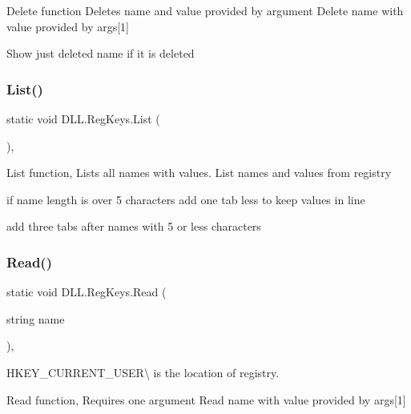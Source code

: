 Delete function Deletes name and value provided by argument Delete name with value provided by args\mbox{[}1\mbox{]}

Show just deleted name if it is deleted \hypertarget{class_d_l_l_1_1_reg_keys_a35d1d2983964074d9d2921927929b6f8}{}\label{class_d_l_l_1_1_reg_keys_a35d1d2983964074d9d2921927929b6f8} 
\subsubsection{\texorpdfstring{List()}{List()}}
{\footnotesize\ttfamily static void D\+L\+L.\+Reg\+Keys.\+List (\begin{DoxyParamCaption}{ }\end{DoxyParamCaption})\hspace{0.3cm}{\ttfamily [inline]}, {\ttfamily [static]}}

List function, Lists all names with values. List names and values from registry

if name length is over 5 characters add one tab less to keep values in line

add three tabs after names with 5 or less characters \hypertarget{class_d_l_l_1_1_reg_keys_aed3a3b9a221dc23713e74117384b7edf}{}\label{class_d_l_l_1_1_reg_keys_aed3a3b9a221dc23713e74117384b7edf} 
\subsubsection{\texorpdfstring{Read()}{Read()}}
{\footnotesize\ttfamily static void D\+L\+L.\+Reg\+Keys.\+Read (\begin{DoxyParamCaption}\item[{string}]{name }\end{DoxyParamCaption})\hspace{0.3cm}{\ttfamily [inline]}, {\ttfamily [static]}}



H\+K\+E\+Y\+\_\+\+C\+U\+R\+R\+E\+N\+T\+\_\+\+U\+S\+ER\textbackslash{} is the location of registry. 

Read function, Requires one argument Read name with value provided by args\mbox{[}1\mbox{]} \hypertarget{class_d_l_l_1_1_reg_keys_ad62d8ed665347517b672f4b44be25428}{}\label{class_d_l_l_1_1_reg_keys_ad62d8ed665347517b672f4b44be25428} 
